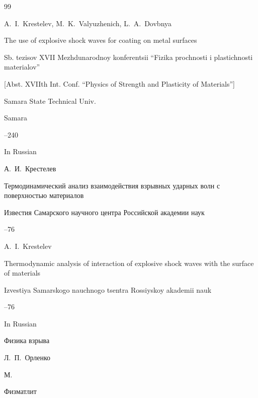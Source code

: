 \begin{thebibliography}{99}
\misctransl

\by A.~I.~Krestelev, M.~K.~Valyuzhenich, L.~A.~Dovbnya

\paper The use of explosive shock waves for coating on metal surfaces

\inbook Sb. tezisov XVII Mezhdunarodnoy konferentsii ``Fizika prochnosti i plastichnosti materialov''

\rm [Abst. XVIIth Int. Conf. ``Physics of Strength and Plasticity of Materials'']

\publ Samara State Technical Univ.

\publaddr Samara


--240

\lang In Russian




\by А.~И.~Крестелев

\paper Термодинамический анализ взаимодействия взрывных ударных волн с поверхностью материалов

\jour Известия Самарского научного центра Российской академии наук




--76


\misctransl

\by A.~I.~Krestelev

\paper Thermodynamic analysis of interaction of explosive shock waves with the surface of materials

\jour Izvestiya Samarskogo nauchnogo tsentra Rossiyskoy akademii nauk




--76

\lang In Russian








\book Физика взрыва


\ed Л.~П.~Орленко

\publaddr М.

\publ Физматлит


\end{thebibliography}
